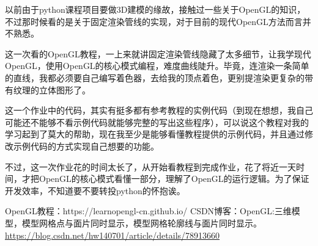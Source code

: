 \documentclass[forprint]{myreport}
\begin{document}
以前由于python课程项目要做3D建模的缘故，接触过一些关于OpenGL的知识，不过那时候看的是关于固定渲染管线的实现，对于目前的现代OpenGL方法而言并不熟悉。

这一次看的OpenGL教程，一上来就讲固定渲染管线隐藏了太多细节，让我学现代OpenGL，使用OpenGL的核心模式编程，难度曲线陡升。毕竟，连渲染一条简单的直线，我都必须要自己编写着色器，去给我的顶点着色，更别提渲染更复杂的带有纹理的立体图形了。

这一个作业中的代码，其实有挺多都有参考教程的实例代码（到现在想想，我自己可能还不能够不看示例代码就能够完整的写出这些程序），可以说这个教程对我的学习起到了莫大的帮助，现在我至少是能够看懂教程提供的示例代码，并且通过修改示例代码的方式实现自己想要的功能。

不过，这一次作业花的时间太长了，从开始看教程到完成作业，花了将近一天时间，才把OpenGL的核心模式看懂一部分，理解了OpenGL的运行逻辑。为了保证开发效率，不知道要不要转投python的怀抱诶。


% 
% 

\begin{thebibliography}{00}
   OpenGL教程：https://learnopengl-cn.github.io/
   CSDN博客：OpenGL:三维模型，模型网格点与面片同时显示，模型网格轮廓线与面片同时显示。\url{https://blog.csdn.net/hw140701/article/details/78913660}
\end{thebibliography}


\cleardoublepage
\end{document}
